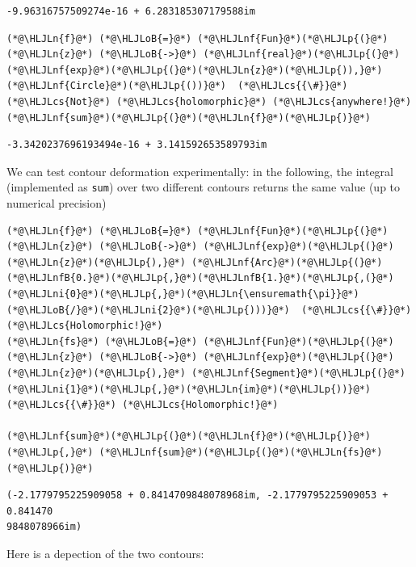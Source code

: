 \documentclass[12pt,a4paper]{article}
\newcommand{\HLJLn}[1]{#1}
\newcommand{\HLJLnf}[1]{\textcolor[RGB]{66,102,213}{#1}}
\newcommand{\HLJLnfB}[1]{\textcolor[RGB]{59,151,46}{#1}}
\newcommand{\HLJLni}[1]{\textcolor[RGB]{59,151,46}{#1}}
\newcommand{\HLJLoB}[1]{\textcolor[RGB]{102,102,102}{\textbf{#1}}}
\newcommand{\HLJLp}[1]{#1}
\newcommand{\HLJLcs}[1]{\textcolor[RGB]{153,153,119}{\textit{#1}}}
\begin{document}
\begin{lstlisting}
-9.96316757509274e-16 + 6.283185307179588im
\end{lstlisting}


\begin{lstlisting}
(*@\HLJLn{f}@*) (*@\HLJLoB{=}@*) (*@\HLJLnf{Fun}@*)(*@\HLJLp{(}@*) (*@\HLJLn{z}@*) (*@\HLJLoB{->}@*) (*@\HLJLnf{real}@*)(*@\HLJLp{(}@*)(*@\HLJLnf{exp}@*)(*@\HLJLp{(}@*)(*@\HLJLn{z}@*)(*@\HLJLp{)),}@*) (*@\HLJLnf{Circle}@*)(*@\HLJLp{())}@*)  (*@\HLJLcs{{\#}}@*) (*@\HLJLcs{Not}@*) (*@\HLJLcs{holomorphic}@*) (*@\HLJLcs{anywhere!}@*)
(*@\HLJLnf{sum}@*)(*@\HLJLp{(}@*)(*@\HLJLn{f}@*)(*@\HLJLp{)}@*)
\end{lstlisting}

\begin{lstlisting}
-3.3420237696193494e-16 + 3.141592653589793im
\end{lstlisting}


We can test contour deformation experimentally: in the following, the  integral (implemented as \texttt{sum}) over two different contours returns the  same value (up to numerical precision)


\begin{lstlisting}
(*@\HLJLn{f}@*) (*@\HLJLoB{=}@*) (*@\HLJLnf{Fun}@*)(*@\HLJLp{(}@*) (*@\HLJLn{z}@*) (*@\HLJLoB{->}@*) (*@\HLJLnf{exp}@*)(*@\HLJLp{(}@*)(*@\HLJLn{z}@*)(*@\HLJLp{),}@*) (*@\HLJLnf{Arc}@*)(*@\HLJLp{(}@*)(*@\HLJLnfB{0.}@*)(*@\HLJLp{,}@*)(*@\HLJLnfB{1.}@*)(*@\HLJLp{,(}@*)(*@\HLJLni{0}@*)(*@\HLJLp{,}@*)(*@\HLJLn{\ensuremath{\pi}}@*)(*@\HLJLoB{/}@*)(*@\HLJLni{2}@*)(*@\HLJLp{)))}@*)  (*@\HLJLcs{{\#}}@*) (*@\HLJLcs{Holomorphic!}@*)
(*@\HLJLn{fs}@*) (*@\HLJLoB{=}@*) (*@\HLJLnf{Fun}@*)(*@\HLJLp{(}@*) (*@\HLJLn{z}@*) (*@\HLJLoB{->}@*) (*@\HLJLnf{exp}@*)(*@\HLJLp{(}@*)(*@\HLJLn{z}@*)(*@\HLJLp{),}@*) (*@\HLJLnf{Segment}@*)(*@\HLJLp{(}@*)(*@\HLJLni{1}@*)(*@\HLJLp{,}@*)(*@\HLJLn{im}@*)(*@\HLJLp{))}@*)  (*@\HLJLcs{{\#}}@*) (*@\HLJLcs{Holomorphic!}@*)

(*@\HLJLnf{sum}@*)(*@\HLJLp{(}@*)(*@\HLJLn{f}@*)(*@\HLJLp{)}@*)  (*@\HLJLp{,}@*) (*@\HLJLnf{sum}@*)(*@\HLJLp{(}@*)(*@\HLJLn{fs}@*)(*@\HLJLp{)}@*)
\end{lstlisting}

\begin{lstlisting}
(-2.1779795225909058 + 0.8414709848078968im, -2.1779795225909053 + 0.841470
9848078966im)
\end{lstlisting}


Here is a depection of the two contours:
\end{document}
